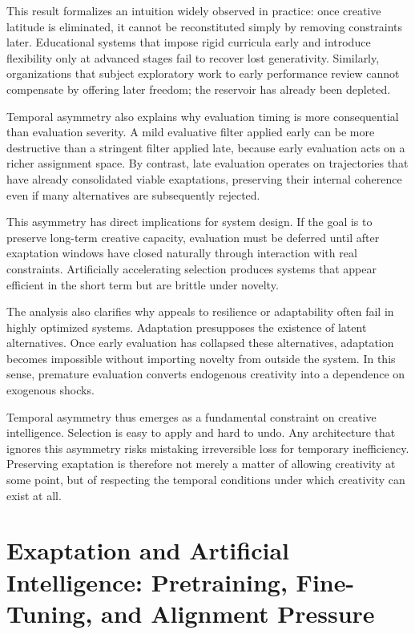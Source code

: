 \documentclass[11pt]{article}
\theoremstyle{definition}
\begin{document}
This result formalizes an intuition widely observed in practice: once creative latitude is eliminated, it cannot be reconstituted simply by removing constraints later. Educational systems that impose rigid curricula early and introduce flexibility only at advanced stages fail to recover lost generativity. Similarly, organizations that subject exploratory work to early performance review cannot compensate by offering later freedom; the reservoir has already been depleted.

Temporal asymmetry also explains why evaluation timing is more consequential than evaluation severity. A mild evaluative filter applied early can be more destructive than a stringent filter applied late, because early evaluation acts on a richer assignment space. By contrast, late evaluation operates on trajectories that have already consolidated viable exaptations, preserving their internal coherence even if many alternatives are subsequently rejected.

This asymmetry has direct implications for system design. If the goal is to preserve long-term creative capacity, evaluation must be deferred until after exaptation windows have closed naturally through interaction with real constraints. Artificially accelerating selection produces systems that appear efficient in the short term but are brittle under novelty.

The analysis also clarifies why appeals to resilience or adaptability often fail in highly optimized systems. Adaptation presupposes the existence of latent alternatives. Once early evaluation has collapsed these alternatives, adaptation becomes impossible without importing novelty from outside the system. In this sense, premature evaluation converts endogenous creativity into a dependence on exogenous shocks.

Temporal asymmetry thus emerges as a fundamental constraint on creative intelligence. Selection is easy to apply and hard to undo. Any architecture that ignores this asymmetry risks mistaking irreversible loss for temporary inefficiency. Preserving exaptation is therefore not merely a matter of allowing creativity at some point, but of respecting the temporal conditions under which creativity can exist at all.

\section{Exaptation and Artificial Intelligence: Pretraining, Fine-Tuning, and Alignment Pressure}
\end{document}
